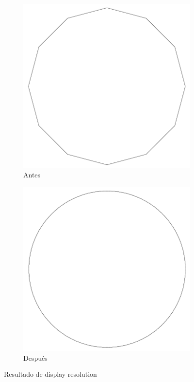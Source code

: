\documentclass{report}
\begin{document}
\begin{figure}[H]
	\centering
	\begin{subfigure}[b]{0.45\textwidth}
		\includegraphics[width=\textwidth]{Imagenes/autocad_display_resolution_03}
		\caption{Antes}
		\label{fig:autocaddisplayresolution03}
	\end{subfigure}
		\begin{subfigure}[b]{0.45\textwidth}
		\includegraphics[width=\textwidth]{Imagenes/autocad_display_resolution_04}
		\caption{Después}
		\label{fig:autocaddisplayresolution04}
	\end{subfigure}
	\caption{Resultado de display resolution}
\end{figure}
\end{document}
